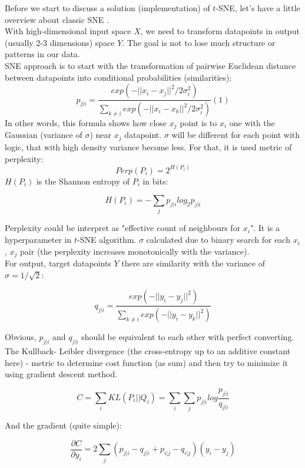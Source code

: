 Before we start to discuss a solution (implementation) of $t$-SNE, let's have a little overview about classic SNE \cite{snearticle}.\\
With high-dimensional input space $X$, we need to transform datapoints in output (usually 2-3 dimensions) space $Y$. The goal is not to lose much structure or patterns in our data.\\
SNE approach is to start with the transformation of pairwise Euclidean distance between datapoints into conditional probabilities (similarities):
\begin{equation}
    p_{j|i} = \frac{exp(-||x_i - x_j||^2 / 2 \sigma_i^2)}{\sum_{k \ne i}{exp(-||x_i - x_k||^2 / 2 \sigma_i^2)}} (1)
\end{equation}
In other words, this formula shows how close $x_j$ point is to $x_i$ one with the Gaussian (variance of $\sigma$) near $x_j$ datapoint. $\sigma$ will be different for each point with logic, that with high density variance become less. For that, it is used metric of perplexity:
$$ Perp(P_i) = 2^{H(P_i)} $$
$H(P_i)$ is the Shannon entropy of $P_i$ in bits:

\begin{equation}
    H(P_i) = -\sum_j{}p_{j|i} log_2{p_{j|i}}
\end{equation}


Perplexity could be interpret as "effective count of neighbours for $x_i$". It is a hyperparameter in $t$-SNE algorithm. $\sigma$ calculated due to binary search for each $x_i$, $x_j$ pair (the perplexity increases monotonically with the variance).\\
For output, target datapoints $Y$ there are similarity with the variance of $\sigma = 1/\sqrt{2}$:

$$ q_{j|i} = \frac{exp(-||y_i - y_j||^2)}{\sum_{k \ne i}{exp(-||y_i - y_k||^2)}} $$

Obvious, $p_{j|i}$ and $q_{j|i}$ should be equivalent to each other with perfect converting. The Kullback-
Leibler divergence (the cross-entropy up to an additive constant here) - metric to determine cost function (as sum) and then try to minimize it using gradient descent method.

\begin{equation}
    C = \sum_i{KL(P_i||Q_i)} = \sum_i{\sum_j{p_{j|i}log{\frac{p_{j|i}}{q_{j|i}}}}}
\end{equation}

And the gradient (quite simple):

$$ \frac{\partial C}{\partial y_i} = 2 \sum_j{(p_{j|i} - q_{j|i} + p_{i|j} - q_{i|j})(y_i - y_j)} $$

